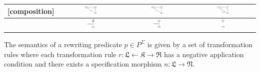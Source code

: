 \documentclass{eceasst}
\begin{document}
\begin{table}[h]
\begin{center}
\begin{tabular}{| l | c | c | c | }
    [composition] 	& \includegraphics[width=0.19\textwidth]{comp-L.pdf} & \includegraphics[width=0.19\textwidth]{comp-R.pdf} & \includegraphics[width=0.19\textwidth]{comp-vis.pdf}  \\ \hline 			
    [inheritance] 	& \includegraphics[width=0.12\textwidth]{inheritance-L.pdf} & \includegraphics[width=0.12\textwidth]{inheritance-R.pdf} & \includegraphics[width=0.05\textwidth]{inheritance-vis.pdf}  \\ 
    \hline    
    \end{tabular}
    \end{center}
\end{table}
\normalsize

\begin{definition}
 The semantics of a rewriting predicate $p \in P^{\Sigma}$ is given by a set of transformation rules where each transformation rule $r: \mathfrak{L}  \leftarrow \mathfrak{K}  \rightarrow 
 \mathfrak{R} $ has a negative application condition and there exists a specification morphism $n: \mathfrak{L} \rightarrow \mathfrak{N} $. 
\end{definition}
\end{document}
